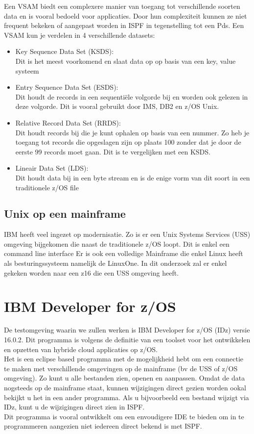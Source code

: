 Een VSAM biedt een complexere manier van toegang tot verschillende soorten data en is vooral bedoeld voor applicaties. Door hun complexiteit kunnen ze niet frequent bekeken of aangepast worden in ISPF in tegenstelling tot een Pds. Een VSAM kun je verdelen in 4 verschillende datasets:
\begin{itemize}
    \item Key Sequence Data Set (KSDS): \\ 
    \space Dit is het meest voorkomend en slaat data op op basis van een key, value systeem
    \item Entry Sequence Data Set (ESDS): \\Dit houdt de records in een sequentiële volgorde bij en worden ook gelezen in deze volgorde. Dit is vooral gebruikt door IMS, DB2 en z/OS Unix.
    \item Relative Record Data Set (RRDS): \\Dit houdt records bij die je kunt ophalen op basis van een nummer. Zo heb je toegang tot records die opgeslagen zijn op plaats 100 zonder dat je door de eerste 99 records moet gaan. Dit is te vergelijken met een KSDS.
    \item Lineair Data Set (LDS): \\Dit houdt data bij in een byte stream en is de enige vorm van dit soort in een traditionele z/OS file
\end{itemize}

\subsection{Unix op een mainframe}
IBM heeft veel ingezet op modernisatie. Zo is er een Unix Systems Services (USS) omgeving bijgekomen die naast de traditionele z/OS loopt. Dit is enkel een command line interface  Er is ook een volledige Mainframe die enkel Linux heeft als besturingssysteem namelijk de LinuxOne. In dit onderzoek zal er enkel gekeken worden naar een z16 die een USS omgeving heeft.


\section{IBM Developer for z/OS}
\label{sec:IBM Developer for z/OS (IDz)}
De testomgeving waarin we zullen werken is IBM Developer for z/OS (IDz) versie 16.0.2. Dit programma is volgens de definitie van \textcite{Spohn2023} een toolset voor het ontwikkelen en opzetten van hybride cloud applicaties op z/OS. \\
Het is een eclipse based programma met de mogelijkheid hebt om een connectie te maken met verschillende omgevingen op de mainframe (bv de USS of z/OS omgeving). Zo kunt u alle bestanden zien, openen en aanpassen. Omdat de data nogsteeds op de mainframe staat, kunnen wijzigingen direct gezien worden ookal bekijkt u het in een ander programma. Als u bijvoorbeeld een bestand wijzigt via IDz, kunt u de wijzigingen direct zien in ISPF. \\
Dit programma is vooral ontwikkelt om een envoudigere IDE te bieden om in te programmeren aangezien niet iedereen direct bekend is met ISPF. \\

